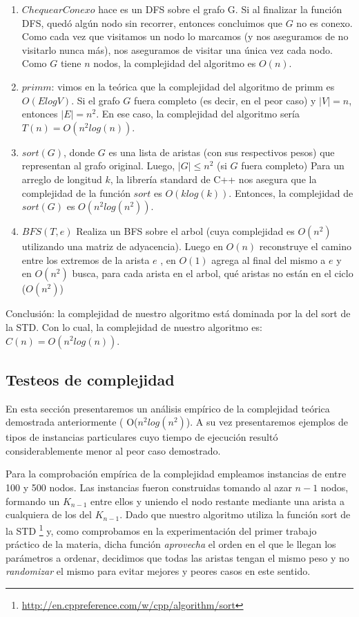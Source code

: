 \documentclass[11pt, a4paper, twoside]{article}
\begin{document}
\begin{enumerate}
	\item $ChequearConexo$ hace es un DFS sobre el grafo G. Si al finalizar la 
	      función DFS, quedó algún
	      nodo sin recorrer, entonces concluimos que $G$ no es conexo. Como cada vez que 
	      visitamos un nodo lo marcamos (y nos aseguramos de no visitarlo nunca más), nos 
	      aseguramos de visitar una única vez cada nodo. Como $G$ tiene $n$ nodos, la 
	      complejidad del algoritmo es $O(n)$.
	\item $primm$: vimos en la teórica que la complejidad del algoritmo de primm es $O(ElogV)$.
	      Si el grafo $G$ fuera completo (es decir, en el peor caso) y $|V| = n$, entonces 
	      $|E| = n^2$. En ese caso, la complejidad del algoritmo sería $T(n) = O(n^2 log(n))$. 
	\item  $sort(G)$, donde $G$ es una lista de aristas (con sus respectivos pesos) 
	      que representan al grafo original. 
	      Luego, $|G| \leq n^2$ (si $G$ fuera completo)  Para un arreglo de longitud $k$, la librería standard de C++ nos asegura que la 
	      complejidad de la función $sort$ es $O(klog(k))$. Entonces, la complejidad de 
	      $sort(G)$ es $O(n^2 log(n^2))$. 
	\item $BFS(T,e)$ Realiza un BFS sobre el arbol (cuya complejidad es $O(n^2)$ utilizando una matriz de adyacencia). Luego en $O(n)$ reconstruye el camino entre los extremos de la arista $e$ , en $O(1)$ agrega al final del mismo a $e$ y en $O(n^2)$ busca, para cada arista en el arbol, qué aristas no están en el ciclo ($O(n^2)$)
	
\end{enumerate}

Conclusión: la complejidad de nuestro algoritmo está dominada por la del sort de la STD.  Con lo cual, la complejidad de nuestro algoritmo es: 
$ C(n) = O(n^2 log(n))$. 



\subsection{Testeos de complejidad}

En esta sección presentaremos un análisis empírico de la complejidad teórica demostrada anteriormente ( O($n^2log(n^2)$). A su vez presentaremos ejemplos de tipos de instancias particulares cuyo tiempo de ejecución resultó considerablemente menor al peor caso demostrado.


Para la comprobación empírica de la complejidad empleamos instancias de entre 100 y 500 nodos. Las instancias fueron construidas tomando al azar $n-1$ nodos, formando un $K_{n-1}$ entre ellos y uniendo el nodo restante mediante una arista a cualquiera de los del $K_{n-1}$. Dado que nuestro algoritmo utiliza la función sort de la STD \footnote{\url{http://en.cppreference.com/w/cpp/algorithm/sort}} y, como comprobamos en la experimentación del primer trabajo práctico de la materia, dicha función \textit{aprovecha} el orden en el que le llegan los parámetros a ordenar, decidimos que todas las aristas tengan el mismo peso y no \textit{randomizar} el mismo para evitar mejores y peores casos en este sentido. 
\end{document}
